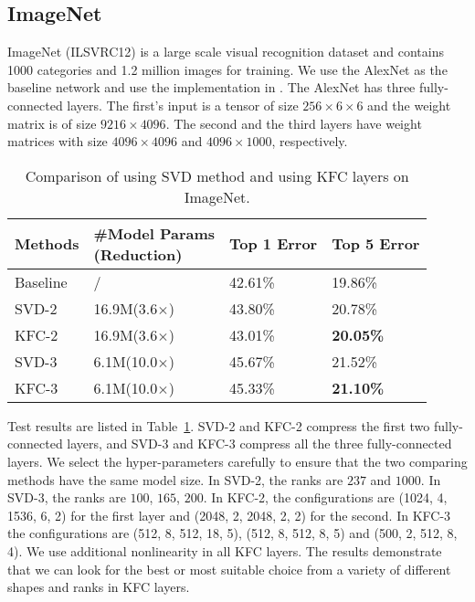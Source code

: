 \documentclass{article}
\begin{document}
\subsection{ImageNet}
ImageNet (ILSVRC12) \cite{ILSVRC15} is a large scale visual recognition dataset and contains 1000 categories and 1.2 million images for training. We
use the AlexNet \cite{krizhevsky2012imagenet} as the baseline network and use the implementation in \cite{ding2014theano}. The AlexNet has three
fully-connected layers. The first's input is a tensor of size $256\times 6 \times 6$ and the weight matrix is of size $9216\times 4096$. The second
and the third layers have weight matrices with size $4096\times 4096$ and $4096 \times 1000$, respectively.
\begin{table}[!ht] \centering \small
\caption{Comparison of using SVD method and using KFC layers on ImageNet.}
\centering
\begin{tabular}{p{1.5cm} p{2cm} p{1.6cm} p{1.6cm}}
    \toprule \parbox[c]{\hsize}{Methods} & \parbox[]{2cm}{\#Model Params\\(Reduction)} & Top 1 Error & Top 5 Error\\
    \midrule Baseline& / & 42.61\% & 19.86\% \\
    \hline
    \midrule SVD-2 & 16.9M(3.6$\times$) & 43.80\% & 20.78\% \\
    \midrule KFC-2 & 16.9M(3.6$\times$) & 43.01\% & \textbf{20.05\%} \\
    \hline
    \midrule SVD-3 & 6.1M(10.0$\times$) & 45.67\% & 21.52\% \\
    \midrule KFC-3 & 6.1M(10.0$\times$) & 45.33\% & \textbf{21.10\%} \\
\hline
\end{tabular}
\label{tab:imagenet}
\end{table}
Test results are listed in Table~\ref{tab:imagenet}. SVD-2 and KFC-2 compress the first two fully-connected layers, and SVD-3 and
KFC-3 compress all the three fully-connected layers. We select the hyper-parameters carefully to ensure that the two comparing methods have the same model size. In SVD-2, the ranks are $237$ and $1000$. In SVD-3, the ranks are $100$, $165$, $200$. In KFC-2,
the configurations are (1024, 4, 1536, 6, 2) for the first layer and (2048, 2, 2048, 2, 2) for the second.
In KFC-3 the configurations are (512, 8, 512, 18, 5), (512, 8, 512, 8, 5) and (500, 2, 512, 8, 4). We use additional nonlinearity in all
KFC layers. The results demonstrate that we can look for the best or most suitable choice from a variety of different shapes and ranks in KFC layers.
\end{document}
